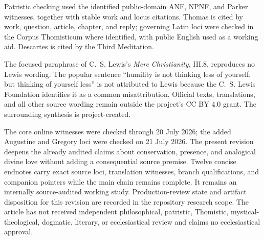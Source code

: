 Patristic checking used the identified public-domain ANF, NPNF, and Parker witnesses, together with stable work and locus citations. Thomas is cited by work, question, article, chapter, and reply; governing Latin loci were checked in the Corpus Thomisticum where identified, with public English used as a working aid. Descartes is cited by the Third Meditation.

The focused paraphrase of C.~S. Lewis's \emph{Mere Christianity}, III.8, reproduces no Lewis wording. The popular sentence ``humility is not thinking less of yourself, but thinking of yourself less'' is not attributed to Lewis because the C.~S. Lewis Foundation identifies it as a common misattribution. Official texts, translations, and all other source wording remain outside the project's CC BY 4.0 grant. The surrounding synthesis is project-created.

The core online witnesses were checked through 20 July 2026; the added Augustine and Gregory loci were checked on 21 July 2026. The present revision deepens the already audited claims about conservation, presence, and analogical divine love without adding a consequential source premise. Twelve concise endnotes carry exact source loci, translation witnesses, branch qualifications, and companion pointers while the main chain remains complete. It remains an internally source-audited working study. Production-review state and artifact disposition for this revision are recorded in the repository research scope. The article has not received independent philosophical, patristic, Thomistic, mystical-theological, dogmatic, literary, or ecclesiastical review and claims no ecclesiastical approval.
